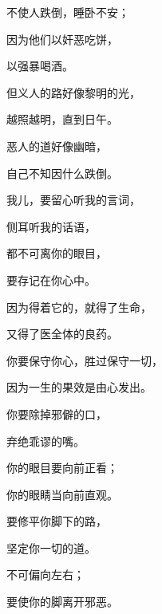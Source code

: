 {\par }{\Q 不使人跌倒，睡卧不安；
\par }{\Q {}因为他们以奸恶吃饼，
\par }{\Q 以强暴喝酒。
\par }{\BB \par }{\Q {}但义人的路好像黎明的光，
\par }{\Q 越照越明，直到日午。
\par }{\Q {}恶人的道好像幽暗，
\par }{\Q 自己不知因什么跌倒。
\par }{\BB \par }{\Q {}我儿，要留心听我的言词，
\par }{\Q 侧耳听我的话语，
\par }{\BB \par }{\Q {}都不可离你的眼目，
\par }{\Q 要存记在你心中。
\par }{\Q {}因为得着它的，就得了生命，
\par }{\Q 又得了医全体的良药。
\par }{\Q {}你要保守你心，胜过保守一切，
\par }{\Q 因为一生的果效是由心发出。
\par }{\Q {}你要除掉邪僻的口，
\par }{\Q 弃绝乖谬的嘴。
\par }{\Q {}你的眼目要向前正看；
\par }{\Q 你的眼睛当向前直观。
\par }{\Q {}要修平你脚下的路，
\par }{\Q 坚定你一切的道。
\par }{\Q {}不可偏向左右；
\par }{\Q 要使你的脚离开邪恶。

}
